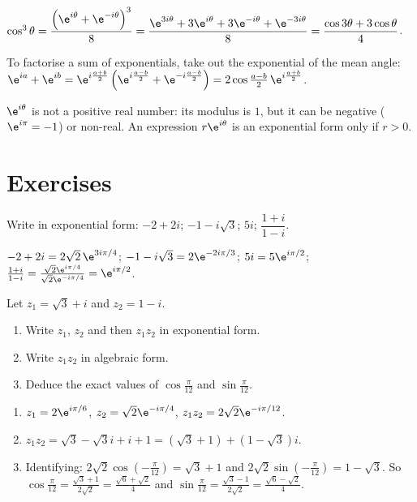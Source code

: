 \begin{method}
$\cos^3\theta=\dfrac{\left(\e^{i\theta}+\e^{-i\theta}\right)^3}{8}=\dfrac{\e^{3i\theta}+3\e^{i\theta}+3\e^{-i\theta}+\e^{-3i\theta}}8=\dfrac{\cos3\theta+3\cos\theta}4$.
\end{method}
\begin{method}
To factorise a sum of exponentials, take out the exponential of the mean angle: $\e^{ia}+\e^{ib}=\e^{i\frac{a+b}2}\left(\e^{i\frac{a-b}2}+\e^{-i\frac{a-b}2}\right)=2\cos\frac{a-b}2\,\e^{i\frac{a+b}2}$.
\end{method}
\begin{pitfall}
$\e^{i\theta}$ is not a positive real number: its modulus is $1$, but it can be negative ($\e^{i\pi}=-1$) or non-real. An expression $r\e^{i\theta}$ is an exponential form only if $r>0$.
\end{pitfall}

\mxnewpage
\section{Exercises}
\begin{exercise}
Write in exponential form: $-2+2i$; $-1-i\sqrt3$; $5i$; $\dfrac{1+i}{1-i}$.
\end{exercise}
\begin{solution}
$-2+2i=2\sqrt2\,\e^{3i\pi/4}$; $-1-i\sqrt3=2\e^{-2i\pi/3}$; $5i=5\e^{i\pi/2}$; $\frac{1+i}{1-i}=\frac{\sqrt2\e^{i\pi/4}}{\sqrt2\e^{-i\pi/4}}=\e^{i\pi/2}$.
\end{solution}

\begin{exercise}
Let $z_1=\sqrt3+i$ and $z_2=1-i$.
\begin{enumerate}
\item Write $z_1$, $z_2$ and then $z_1z_2$ in exponential form.
\item Write $z_1z_2$ in algebraic form.
\item Deduce the exact values of $\cos\frac\pi{12}$ and $\sin\frac\pi{12}$.
\end{enumerate}
\end{exercise}
\begin{solution}
\begin{enumerate}
\item $z_1=2\e^{i\pi/6}$, $z_2=\sqrt2\e^{-i\pi/4}$, $z_1z_2=2\sqrt2\e^{-i\pi/12}$.
\item $z_1z_2=\sqrt3-\sqrt3i+i+1=\left(\sqrt3+1\right)+\left(1-\sqrt3\right)i$.
\item Identifying: $2\sqrt2\cos\left(-\frac\pi{12}\right)=\sqrt3+1$ and $2\sqrt2\sin\left(-\frac\pi{12}\right)=1-\sqrt3$. So $\cos\frac\pi{12}=\frac{\sqrt3+1}{2\sqrt2}=\frac{\sqrt6+\sqrt2}4$ and $\sin\frac\pi{12}=\frac{\sqrt3-1}{2\sqrt2}=\frac{\sqrt6-\sqrt2}4$.
\end{enumerate}
\end{solution}

